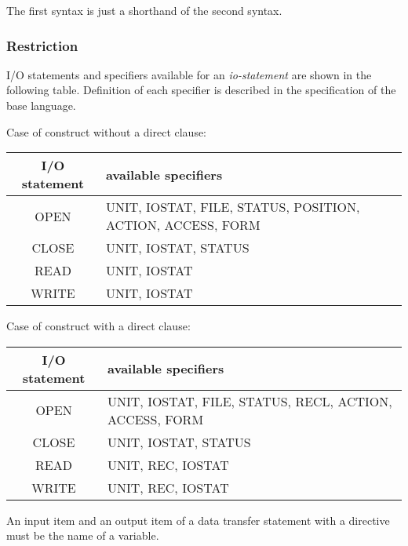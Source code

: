    The first syntax is just a shorthand of the second syntax.

   \subsubsection*{Restriction}

   I/O statements and specifiers available for an {\it io-statement} are
   shown in the following table.
   Definition of each specifier is described in the specification of the base language. 

   Case of \gio construct without a direct clause:
   \begin{table}[h]
   \begin{center}
    \label{tb:globalstatement}
    \begin{tabular}{|c||l|}
      \hline
     I/O statement & available specifiers \\ \hline \hline
     OPEN & UNIT, IOSTAT, FILE, STATUS, POSITION, ACTION, ACCESS, FORM \\ \hline
     CLOSE & UNIT, IOSTAT, STATUS \\ \hline
     READ & UNIT, IOSTAT \\ \hline
     WRITE & UNIT, IOSTAT \\ \hline
    \end{tabular}
   \end{center}
   \end{table}

   Case of \gio construct with a direct clause:
   \begin{table}[h]
   \begin{center}
    \label{tb:globalstatement}
    \begin{tabular}{|c||l|}
      \hline
     I/O statement & available specifiers \\ \hline \hline
     OPEN & UNIT, IOSTAT, FILE, STATUS, RECL, ACTION, ACCESS, FORM \\ \hline
     CLOSE & UNIT, IOSTAT, STATUS \\ \hline
     READ & UNIT, REC, IOSTAT \\ \hline
     WRITE & UNIT, REC, IOSTAT \\ \hline
    \end{tabular}
   \end{center}
   \end{table}

   An input item and an output item of a data transfer statement with
   a \gio directive must be the name of a variable.
   
